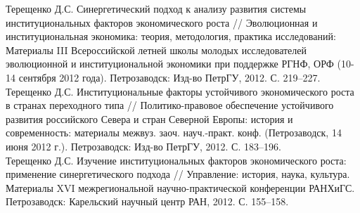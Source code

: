 \documentclass[10pt]{article}
\newcommand{\years}[1]{\marginnote{\scriptsize #1}}
\begin{document}
\years{2012}Терещенко Д.С. Синергетический подход к анализу развития системы институциональных факторов экономического роста // Эволюционная и институциональная экономика: теория, методология, практика исследований: Материалы III Всероссийской летней школы молодых исследователей эволюционной и институциональной экономики при поддержке РГНФ, ОРФ (10-14 сентября 2012 года). Петрозаводск: Изд-во ПетрГУ, 2012. С. 219–227.\\
\years{2012}Терещенко Д.С. Институциональные факторы устойчивого экономического роста в странах переходного типа // Политико-правовое обеспечение устойчивого развития российского Севера и стран Северной Европы: история и современность: материалы межвуз. заоч. науч.-практ. конф. (Петрозаводск, 14 июня 2012 г.). Петрозаводск: Изд-во ПетрГУ, 2012. С. 183–196.\\
\years{2012}Терещенко Д.С. Изучение институциональных факторов экономического роста: применение синергетического подхода // Управление: история, наука, культура. Материалы XVI межрегиональной научно-практической конференции РАНХиГС. Петрозаводск: Карельский научный центр РАН, 2012. С. 155–158.\\
\end{document}
